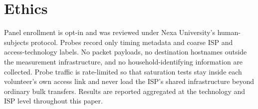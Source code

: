 \section{Ethics}
\label{sec:ethics}
Panel enrollment is opt-in and was reviewed under Nexa University's human-subjects
protocol. Probes record only timing metadata and coarse ISP and access-technology labels.
No packet payloads, no destination hostnames outside the measurement infrastructure, and
no household-identifying information are collected. Probe traffic is rate-limited so that
saturation tests stay inside each volunteer's own access link and never load the ISP's
shared infrastructure beyond ordinary bulk transfers. Results are reported aggregated at
the technology and ISP level throughout this paper.
